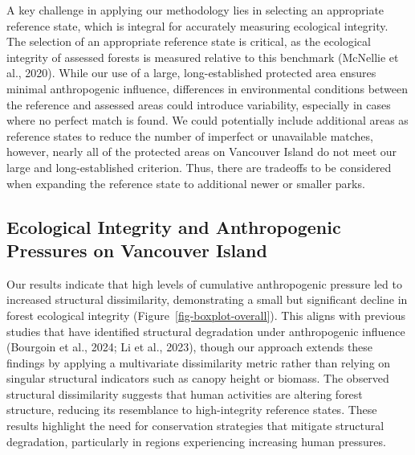 \documentclass[
]{agujournal2019}
\begin{document}
A key challenge in applying our methodology lies in selecting an
appropriate reference state, which is integral for accurately measuring
ecological integrity. The selection of an appropriate reference state is
critical, as the ecological integrity of assessed forests is measured
relative to this benchmark (McNellie et al., 2020). While our use of a
large, long-established protected area ensures minimal anthropogenic
influence, differences in environmental conditions between the reference
and assessed areas could introduce variability, especially in cases
where no perfect match is found. We could potentially include additional
areas as reference states to reduce the number of imperfect or
unavailable matches, however, nearly all of the protected areas on
Vancouver Island do not meet our large and long-established criterion.
Thus, there are tradeoffs to be considered when expanding the reference
state to additional newer or smaller parks.

\subsection{Ecological Integrity and Anthropogenic Pressures on
Vancouver
Island}\label{ecological-integrity-and-anthropogenic-pressures-on-vancouver-island}

Our results indicate that high levels of cumulative anthropogenic
pressure led to increased structural dissimilarity, demonstrating a
small but significant decline in forest ecological integrity
(Figure~\ref{fig-boxplot-overall}). This aligns with previous studies
that have identified structural degradation under anthropogenic
influence (Bourgoin et al., 2024; Li et al., 2023), though our approach
extends these findings by applying a multivariate dissimilarity metric
rather than relying on singular structural indicators such as canopy
height or biomass. The observed structural dissimilarity suggests that
human activities are altering forest structure, reducing its resemblance
to high-integrity reference states. These results highlight the need for
conservation strategies that mitigate structural degradation,
particularly in regions experiencing increasing human pressures.
\end{document}
